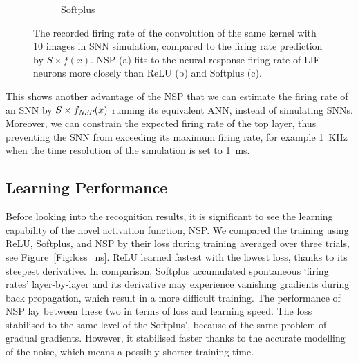 \documentclass{article}
\begin{document}
\begin{figure}[hb!]
\begin{subfigure}[hb]{0.32\textwidth}
			\caption{Softplus}
		\end{subfigure}
		\caption{
			The recorded firing rate of the convolution of the same kernel with 10 images in SNN simulation, compared to the firing rate prediction by $S \times f(x)$.
			NSP (a) fits to the neural response firing rate of LIF neurons more closely than ReLU (b) and Softplus (c).}
		\label{fig:af_compare}
	\end{figure}		
	
	This shows another advantage of the NSP that we can estimate the firing rate of an SNN by $S \times f_{\textit{\textrm{NSP}}}(x)$ running its equivalent ANN, instead of simulating SNNs.
	Moreover, we can constrain the expected firing rate of the top layer, thus preventing the SNN from exceeding its maximum firing rate, for example 1~KHz when the time resolution of the simulation is set to 1~ms.
	
	
	\subsection{Learning Performance}
	Before looking into the recognition results, it is significant to see the learning capability of the novel activation function, NSP.
	We compared the training using ReLU, Softplus, and NSP by their loss during training averaged over three trials, see Figure~\ref{Fig:loss_ns}.
	ReLU learned fastest with the lowest loss, thanks to its steepest derivative.
	In comparison, Softplus accumulated spontaneous `firing rates' layer-by-layer and its derivative may experience vanishing gradients during back propagation, which result in a more difficult training.
	The performance of NSP lay between these two in terms of loss and learning speed.
	The loss stabilised to the same level of the Softplus', because of the same problem of gradual gradients.
	However, it stabilised faster thanks to the accurate modelling of the noise, which means a possibly shorter training time.
	
\end{document}

